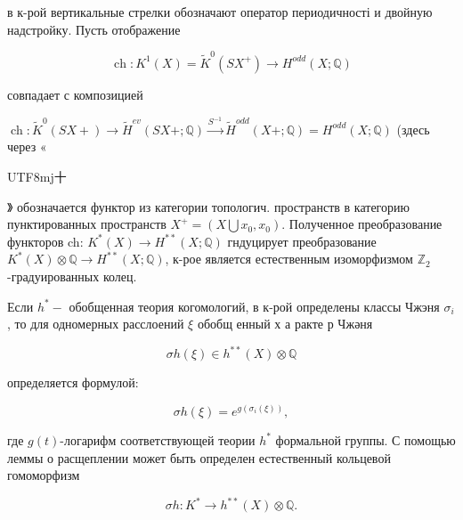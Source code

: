 \documentclass[10pt]{article}
\begin{document}
в к-рой вертикальные стрелки обозначают оператор периодичності и двойную надстройку. Пусть отображение



\[

\operatorname{ch}: K^{1}(X)=\tilde{K}^{0}\left(S X^{+}\right) \rightarrow H^{o d d}(X ; \mathbb{Q})

\]



совпадает с композицией



$\operatorname{ch}: \tilde{K}^{0}(S X+) \rightarrow \tilde{H}^{e v}(S X+; \mathbb{Q}) \stackrel{S^{-1}}{\rightarrow} \tilde{H}^{o d d}(X+; \mathbb{Q})=H^{o d d}(X ; \mathbb{Q})$ (здесь через «\begin{CJK}{UTF8}{mj}十\end{CJK}》 обозначается функтор из категории топологич. пространств в категорию пунктированных пространств $X^{+}=\left(X \bigcup x_{0}, x_{0}\right)$. Полученное преобразование функторов ch: $K^{*}(X) \rightarrow H^{* *}(X ; \mathbb{Q})$ гндуцирует преобразование $K^{*}(X) \otimes \mathbb{Q} \longrightarrow H^{* *}(X ; \mathbb{Q})$, к-рое является естественным изоморфизмом $\mathbb{Z}_{2}$-градуированных колец.



Если $h^{*}-$ обобщенная теория когомологий, в к-рой определены классы Чжэня $\sigma_{i}$, то для одномерных расслоений $\xi$ обобщ енный х а ракте р Чжәня



\[

\sigma h(\xi) \in h^{* *}(X) \otimes \mathbb{Q}

\]



определяется формулой:



\[

\sigma h(\xi)=e^{g\left(\sigma_{i}(\xi)\right)},

\]



где $g(t)$-логарифм соответствующей теории $h^{*}$ формальной группы. С помощью леммы о расщеплении может быть определен естественный кольцевой гомоморфизм



\[

\sigma h: K^{*} \rightarrow h^{* *}(X) \otimes \mathbb{Q} .

\]
\end{document}
